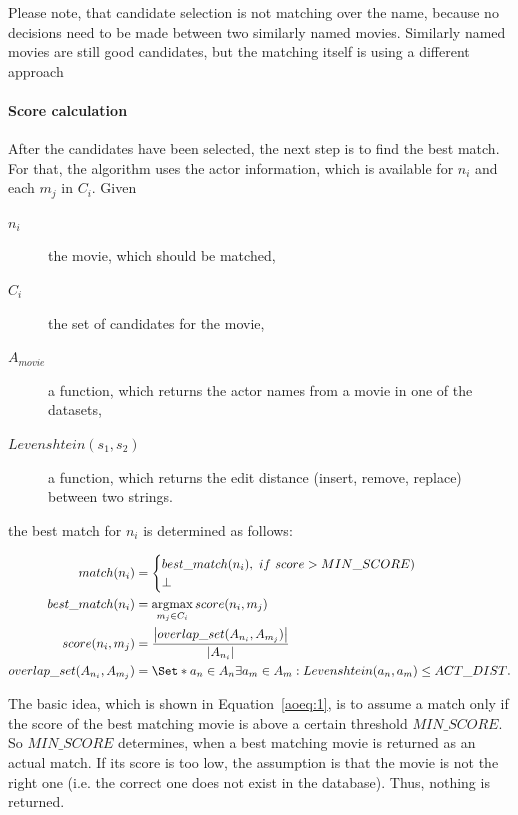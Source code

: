 Please note, that candidate selection is not matching over the name, because no decisions need to be made between two similarly named movies.
Similarly named movies are still good candidates, but the matching itself is using a different approach

\paragraph{Score calculation}
After the candidates have been selected, the next step is to find the best match.
For that, the algorithm uses the actor information, which is available for $n_i$ and each $m_j$ in $C_i$.
Given
\begin{description}
	\item[$n_i$] the movie, which should be matched,
	\item[$C_i$] the set of candidates for the movie,
	\item[$A_{movie}$] a function, which returns the actor names from a movie in one of the datasets,
	\item[$Levenshtein(s_1, s_2)$] a function, which returns the edit distance (insert, remove, replace) between two strings.
\end{description}
the best match for $n_i$ is determined as follows:

\begin{align}
	match(n_i) &=
		\begin{cases}
			best\_match(n_i),~if~score > MIN\_SCORE) \\
			\bot
		\end{cases}\label{aoeq:1}\\
	best\_match(n_i) &=
		\argmax_{m_j \in C_i} score(n_i, m_j)\label{aoeq:2}\\
	score(n_i, m_j) &=
		\frac
			{\left\lvert overlap\_set(A_{n_i}, A_{m_j}) \right\rvert}
			{\left\lvert A_{n_i} \right\rvert}\label{aoeq:3}\\
	overlap\_set(A_{n_i}, A_{m_j}) &=
		\Set*{a_n \in A_n}{\exists a_m \in A_m: Levenshtein(a_n, a_m) \leq ACT\_DIST}.\label{aoeq:4}
\end{align}

The basic idea, which is shown in Equation~\ref{aoeq:1}, is to assume a match only if the score of the best matching movie is above a certain threshold $MIN\_SCORE$.
So $MIN\_SCORE$ determines, when a best matching movie is returned as an actual match.
If its score is too low, the assumption is that the movie is not the right one (i.e. the correct one does not exist in the database).
Thus, nothing is returned.

